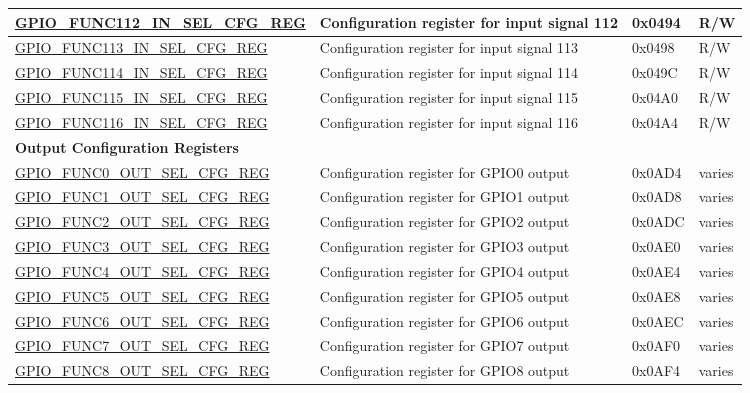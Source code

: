\begin{longtable}{ | p{5.5cm} | p{7cm} | p{1.3cm} | p{1.9cm} | }
\hyperref[regdesc:GPIOFUNCUINSELCFGREG]{GPIO\_FUNC112\_IN\_SEL\_CFG\_REG} & Configuration register for input signal 112 & 0x0494 & R/W \\ \hline
\hyperref[regdesc:GPIOFUNCUINSELCFGREG]{GPIO\_FUNC113\_IN\_SEL\_CFG\_REG} & Configuration register for input signal 113 & 0x0498 & R/W \\ \hline
\hyperref[regdesc:GPIOFUNCUINSELCFGREG]{GPIO\_FUNC114\_IN\_SEL\_CFG\_REG} & Configuration register for input signal 114 & 0x049C & R/W \\ \hline
\hyperref[regdesc:GPIOFUNCUINSELCFGREG]{GPIO\_FUNC115\_IN\_SEL\_CFG\_REG} & Configuration register for input signal 115 & 0x04A0 & R/W \\ \hline
\hyperref[regdesc:GPIOFUNCUINSELCFGREG]{GPIO\_FUNC116\_IN\_SEL\_CFG\_REG} & Configuration register for input signal 116 & 0x04A4 & R/W \\ \hline
\multicolumn{4}{|l|}{\textbf{Output Configuration Registers}} \\ \hline
\hyperref[regdesc:GPIOFUNCNOUTSELCFGREG]{GPIO\_FUNC0\_OUT\_SEL\_CFG\_REG} & Configuration register for GPIO0 output & 0x0AD4 & varies \\ \hline
\hyperref[regdesc:GPIOFUNCNOUTSELCFGREG]{GPIO\_FUNC1\_OUT\_SEL\_CFG\_REG} & Configuration register for GPIO1 output & 0x0AD8 & varies \\ \hline
\hyperref[regdesc:GPIOFUNCNOUTSELCFGREG]{GPIO\_FUNC2\_OUT\_SEL\_CFG\_REG} & Configuration register for GPIO2 output & 0x0ADC & varies \\ \hline
\hyperref[regdesc:GPIOFUNCNOUTSELCFGREG]{GPIO\_FUNC3\_OUT\_SEL\_CFG\_REG} & Configuration register for GPIO3 output & 0x0AE0 & varies \\ \hline
\hyperref[regdesc:GPIOFUNCNOUTSELCFGREG]{GPIO\_FUNC4\_OUT\_SEL\_CFG\_REG} & Configuration register for GPIO4 output & 0x0AE4 & varies \\ \hline
\hyperref[regdesc:GPIOFUNCNOUTSELCFGREG]{GPIO\_FUNC5\_OUT\_SEL\_CFG\_REG} & Configuration register for GPIO5 output & 0x0AE8 & varies \\ \hline
\hyperref[regdesc:GPIOFUNCNOUTSELCFGREG]{GPIO\_FUNC6\_OUT\_SEL\_CFG\_REG} & Configuration register for GPIO6 output & 0x0AEC & varies \\ \hline
\hyperref[regdesc:GPIOFUNCNOUTSELCFGREG]{GPIO\_FUNC7\_OUT\_SEL\_CFG\_REG} & Configuration register for GPIO7 output & 0x0AF0 & varies \\ \hline
\hyperref[regdesc:GPIOFUNCNOUTSELCFGREG]{GPIO\_FUNC8\_OUT\_SEL\_CFG\_REG} & Configuration register for GPIO8 output & 0x0AF4 & varies \\ \hline

\end{longtable}
